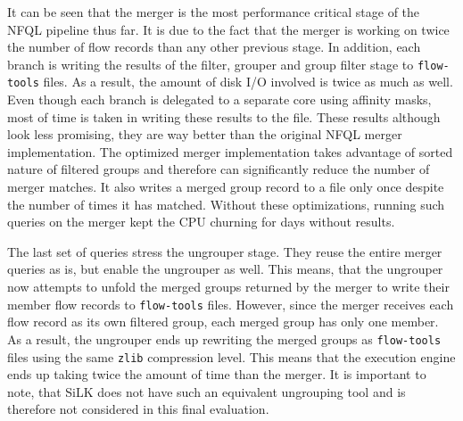 It can be seen that the merger is the most performance critical stage of the
\ac{NFQL} pipeline thus far. It is due to the fact that the merger is working
on twice the number of flow records than any other previous stage. In
addition, each branch is writing the results of the filter, grouper and group
filter stage to \texttt{flow-tools} files. As a result, the amount of disk I/O
involved is twice as much as well. Even though each branch is delegated to a
separate core using affinity masks, most of time is taken in writing these
results to the file. These results although look less promising, they are way
better than the original \ac{NFQL} merger implementation. The optimized
merger implementation takes advantage of sorted nature of filtered groups and
therefore can significantly reduce the number of merger matches. It also
writes a merged group record to a file only once despite the number of times
it has matched. Without these optimizations, running such queries on the
merger kept the CPU churning for days without results.

The last set of queries stress the ungrouper stage. They reuse the entire
merger queries as is, but enable the ungrouper as well. This means, that the
ungrouper now attempts to unfold the merged groups returned by the merger to
write their member flow records to \texttt{flow-tools} files.  However, since
the merger receives each flow record as its own filtered group, each merged
group has only one member. As a result, the ungrouper ends up rewriting the
merged groups as \texttt{flow-tools} files using the same \texttt{zlib}
compression level. This means that the execution engine ends up taking twice
the amount of time than the merger. It is important to note, that SiLK does
not have such an equivalent ungrouping tool and is therefore not considered in
this final evaluation.
